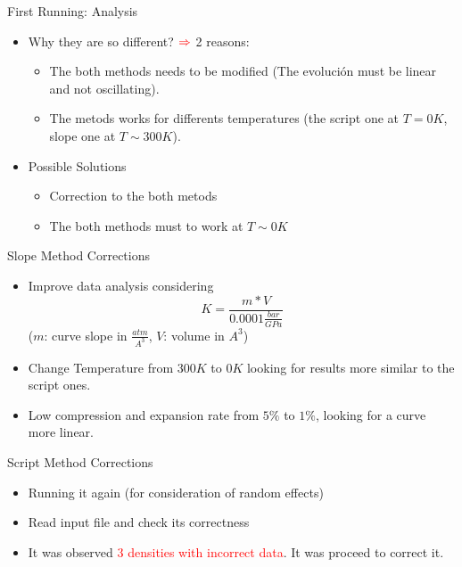 \documentclass[11pt]{beamer}
\begin{document}
\begin{frame}{First Running: Analysis}
\begin{itemize}
    \item Why they are so different? $\textcolor{red}{\Rightarrow}$ 2 reasons:
          \begin{itemize}
          \item The both methods needs to be modified (The evolución must be linear and not oscillating).
          \item The metods works for differents temperatures (the script one at $T = 0K$, slope one at $T \sim 300K$).
          \end{itemize}
    \item Possible Solutions
    \begin{itemize}
    \item Correction to the both metods
    \item The both methods must to work at $T \sim 0K $
    \end{itemize}
\end{itemize}
\end{frame}
\begin{frame}{Slope Method Corrections}
\begin{itemize}
    \item Improve data analysis considering 
    \begin{equation}\label{slope}K=\frac{m*V}{0.0001\frac{bar}{GPa}}\end{equation}
    ($m$: curve slope in $\frac{atm}{A^3}$, $V$: volume in $A^3$)
    \item Change Temperature from $300K$ to $0K$ looking for results more similar to the script ones.
    \item Low compression and expansion rate from $5\%$ to $1\%$, looking for a curve more linear.
\end{itemize}
\end{frame}
\begin{frame}{Script Method Corrections}
\begin{itemize}
    \item Running it again (for consideration of random effects)
    \item Read input file and check its correctness
    \item It was observed \textcolor{red}{3 densities with incorrect data}. It was proceed to correct it.
\end{itemize}
\end{frame}
\end{document}
